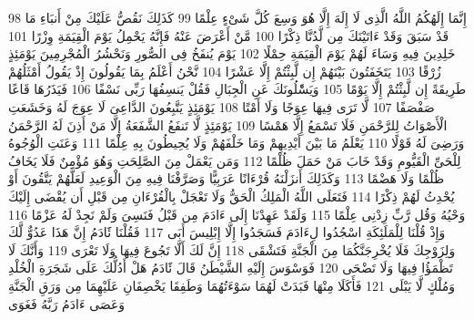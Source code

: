 \documentclass[20pt,a4paper]{article}
\begin{document}
{\tiny\colorbox{cl_aya}{98}} إِنَّمَا إِلَهُكُمُ اللَّهُ الَّذِى لَا إِلَهَ إِلَّا هُوَ وَسِعَ كُلَّ شَىْءٍ عِلْمًا
{\tiny\colorbox{cl_aya}{99}} كَذَلِكَ نَقُصُّ عَلَيْكَ مِنْ أَنبَاءِ مَا قَدْ سَبَقَ وَقَدْ ءَاتَيْنَكَ مِن لَّدُنَّا ذِكْرًا
{\tiny\colorbox{cl_aya}{100}} مَّنْ أَعْرَضَ عَنْهُ فَإِنَّهُ يَحْمِلُ يَوْمَ الْقِيَمَةِ وِزْرًا
{\tiny\colorbox{cl_aya}{101}} خَلِدِينَ فِيهِ وَسَاءَ لَهُمْ يَوْمَ الْقِيَمَةِ حِمْلًا
{\tiny\colorbox{cl_aya}{102}} يَوْمَ يُنفَخُ فِى الصُّورِ وَنَحْشُرُ الْمُجْرِمِينَ يَوْمَئِذٍ زُرْقًا
{\tiny\colorbox{cl_aya}{103}} يَتَخَفَتُونَ بَيْنَهُمْ إِن لَّبِثْتُمْ إِلَّا عَشْرًا
{\tiny\colorbox{cl_aya}{104}} نَّحْنُ أَعْلَمُ بِمَا يَقُولُونَ إِذْ يَقُولُ أَمْثَلُهُمْ طَرِيقَةً إِن لَّبِثْتُمْ إِلَّا يَوْمًا
{\tiny\colorbox{cl_aya}{105}} وَيَسَْٔلُونَكَ عَنِ الْجِبَالِ فَقُلْ يَنسِفُهَا رَبِّى نَسْفًا
{\tiny\colorbox{cl_aya}{106}} فَيَذَرُهَا قَاعًا صَفْصَفًا
{\tiny\colorbox{cl_aya}{107}} لَّا تَرَى فِيهَا عِوَجًا وَلَا أَمْتًا
{\tiny\colorbox{cl_aya}{108}} يَوْمَئِذٍ يَتَّبِعُونَ الدَّاعِىَ لَا عِوَجَ لَهُ وَخَشَعَتِ الْأَصْوَاتُ لِلرَّحْمَنِ فَلَا تَسْمَعُ إِلَّا هَمْسًا
{\tiny\colorbox{cl_aya}{109}} يَوْمَئِذٍ لَّا تَنفَعُ الشَّفَعَةُ إِلَّا مَنْ أَذِنَ لَهُ الرَّحْمَنُ وَرَضِىَ لَهُ قَوْلًا
{\tiny\colorbox{cl_aya}{110}} يَعْلَمُ مَا بَيْنَ أَيْدِيهِمْ وَمَا خَلْفَهُمْ وَلَا يُحِيطُونَ بِهِ عِلْمًا
{\tiny\colorbox{cl_aya}{111}} وَعَنَتِ الْوُجُوهُ لِلْحَىِّ الْقَيُّومِ وَقَدْ خَابَ مَنْ حَمَلَ ظُلْمًا
{\tiny\colorbox{cl_aya}{112}} وَمَن يَعْمَلْ مِنَ الصَّلِحَتِ وَهُوَ مُؤْمِنٌ فَلَا يَخَافُ ظُلْمًا وَلَا هَضْمًا
{\tiny\colorbox{cl_aya}{113}} وَكَذَلِكَ أَنزَلْنَهُ قُرْءَانًا عَرَبِيًّا وَصَرَّفْنَا فِيهِ مِنَ الْوَعِيدِ لَعَلَّهُمْ يَتَّقُونَ أَوْ يُحْدِثُ لَهُمْ ذِكْرًا
{\tiny\colorbox{cl_aya}{114}} فَتَعَلَى اللَّهُ الْمَلِكُ الْحَقُّ وَلَا تَعْجَلْ بِالْقُرْءَانِ مِن قَبْلِ أَن يُقْضَى إِلَيْكَ وَحْيُهُ وَقُل رَّبِّ زِدْنِى عِلْمًا
{\tiny\colorbox{cl_aya}{115}} وَلَقَدْ عَهِدْنَا إِلَى ءَادَمَ مِن قَبْلُ فَنَسِىَ وَلَمْ نَجِدْ لَهُ عَزْمًا
{\tiny\colorbox{cl_aya}{116}} وَإِذْ قُلْنَا لِلْمَلَئِكَةِ اسْجُدُوا لِءَادَمَ فَسَجَدُوا إِلَّا إِبْلِيسَ أَبَى
{\tiny\colorbox{cl_aya}{117}} فَقُلْنَا ئََادَمُ إِنَّ هَذَا عَدُوٌّ لَّكَ وَلِزَوْجِكَ فَلَا يُخْرِجَنَّكُمَا مِنَ الْجَنَّةِ فَتَشْقَى
{\tiny\colorbox{cl_aya}{118}} إِنَّ لَكَ أَلَّا تَجُوعَ فِيهَا وَلَا تَعْرَى
{\tiny\colorbox{cl_aya}{119}} وَأَنَّكَ لَا تَظْمَؤُا فِيهَا وَلَا تَضْحَى
{\tiny\colorbox{cl_aya}{120}} فَوَسْوَسَ إِلَيْهِ الشَّيْطَنُ قَالَ ئََادَمُ هَلْ أَدُلُّكَ عَلَى شَجَرَةِ الْخُلْدِ وَمُلْكٍ لَّا يَبْلَى
{\tiny\colorbox{cl_aya}{121}} فَأَكَلَا مِنْهَا فَبَدَتْ لَهُمَا سَوْءَتُهُمَا وَطَفِقَا يَخْصِفَانِ عَلَيْهِمَا مِن وَرَقِ الْجَنَّةِ وَعَصَى ءَادَمُ رَبَّهُ فَغَوَى
\end{document}
